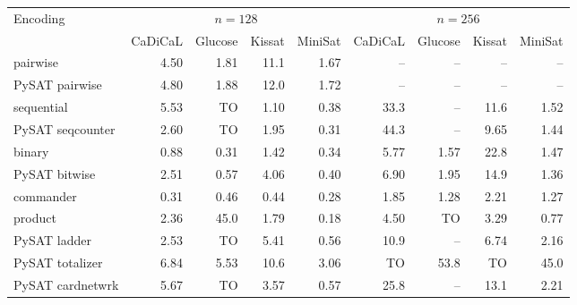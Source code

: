 \begin{tabular}{@{}lrrrrrrrr@{}}
\toprule
Encoding & \multicolumn{4}{c}{$n=128$} & \multicolumn{4}{c}{$n=256$} \\
\cmidrule(lr){2-5}\cmidrule(lr){6-9}
 & CaDiCaL & Glucose & Kissat & MiniSat & CaDiCaL & Glucose & Kissat & MiniSat \\
\midrule
pairwise & 4.50 & 1.81 & 11.1 & 1.67 & -- & -- & -- & -- \\
PySAT pairwise & 4.80 & 1.88 & 12.0 & 1.72 & -- & -- & -- & -- \\
sequential & 5.53 & TO & 1.10 & 0.38 & 33.3 & -- & 11.6 & 1.52 \\
PySAT seqcounter & 2.60 & TO & 1.95 & 0.31 & 44.3 & -- & 9.65 & 1.44 \\
binary & 0.88 & 0.31 & 1.42 & 0.34 & 5.77 & 1.57 & 22.8 & 1.47 \\
PySAT bitwise & 2.51 & 0.57 & 4.06 & 0.40 & 6.90 & 1.95 & 14.9 & 1.36 \\
commander & 0.31 & 0.46 & 0.44 & 0.28 & 1.85 & 1.28 & 2.21 & 1.27 \\
product & 2.36 & 45.0 & 1.79 & 0.18 & 4.50 & TO & 3.29 & 0.77 \\
\midrule
PySAT ladder & 2.53 & TO & 5.41 & 0.56 & 10.9 & -- & 6.74 & 2.16 \\
PySAT totalizer & 6.84 & 5.53 & 10.6 & 3.06 & TO & 53.8 & TO & 45.0 \\
PySAT cardnetwrk & 5.67 & TO & 3.57 & 0.57 & 25.8 & -- & 13.1 & 2.21 \\
\bottomrule
\end{tabular}
